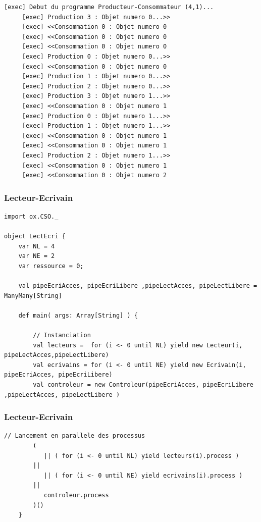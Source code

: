 \documentclass[slidetop,11pt]{beamer}
\begin{document}
\begin{frame} [containsverbatim]
\begin{lstlisting}[frame=trBL,title={Producteurs-Consommateurs : Résultat de l'éxécution}, firstnumber=last]   
     [exec] Debut du programme Producteur-Consommateur (4,1)...
     [exec] Production 3 : Objet numero 0...>>
     [exec] <<Consommation 0 : Objet numero 0
     [exec] <<Consommation 0 : Objet numero 0
     [exec] <<Consommation 0 : Objet numero 0
     [exec] Production 0 : Objet numero 0...>>
     [exec] <<Consommation 0 : Objet numero 0
     [exec] Production 1 : Objet numero 0...>>
     [exec] Production 2 : Objet numero 0...>>
     [exec] Production 3 : Objet numero 1...>>
     [exec] <<Consommation 0 : Objet numero 1
     [exec] Production 0 : Objet numero 1...>>
     [exec] Production 1 : Objet numero 1...>>
     [exec] <<Consommation 0 : Objet numero 1
     [exec] <<Consommation 0 : Objet numero 1
     [exec] Production 2 : Objet numero 1...>>
     [exec] <<Consommation 0 : Objet numero 1
     [exec] <<Consommation 0 : Objet numero 2
\end{lstlisting} 
\end{frame}

\begin{frame} [containsverbatim]
\frametitle{Lecteur-Ecrivain}
\begin{lstlisting}[frame=trBL]
import ox.CSO._

object LectEcri {
    var NL = 4
    var NE = 2
    var ressource = 0;
    
    val pipeEcriAcces, pipeEcriLibere ,pipeLectAcces, pipeLectLibere = ManyMany[String]
    
    def main( args: Array[String] ) {
        
        // Instanciation
        val lecteurs =  for (i <- 0 until NL) yield new Lecteur(i, pipeLectAcces,pipeLectLibere)
        val ecrivains = for (i <- 0 until NE) yield new Ecrivain(i, pipeEcriAcces, pipeEcriLibere)
        val controleur = new Controleur(pipeEcriAcces, pipeEcriLibere ,pipeLectAcces, pipeLectLibere )
\end{lstlisting}
\end{frame}     

\begin{frame} [containsverbatim]
\frametitle{Lecteur-Ecrivain}
\begin{lstlisting}[frame=trBL]   
        // Lancement en parallele des processus
        ( 
           || ( for (i <- 0 until NL) yield lecteurs(i).process )
        || 
           || ( for (i <- 0 until NE) yield ecrivains(i).process )
        || 
           controleur.process 
        )()
    }
\end{lstlisting}
\end{frame}
\end{document}
